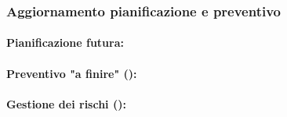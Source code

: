 \subsubsection{Aggiornamento pianificazione e preventivo}

\paragraph*{Pianificazione futura:}

\paragraph*{Preventivo "a finire" ():}

\paragraph*{Gestione dei rischi ():}

